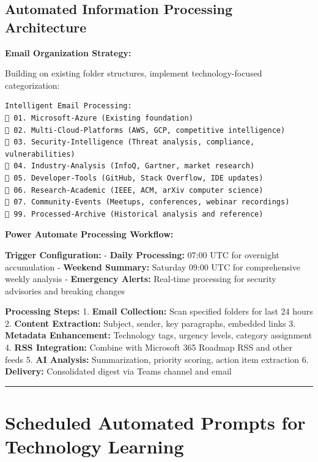 \documentclass[
  letterpaper,
  DIV=11,
  numbers=noendperiod]{scrartcl}
\begin{document}
\subsection{Automated Information Processing
Architecture}\label{automated-information-processing-architecture}

\textbf{Email Organization Strategy:}

Building on existing folder structures, implement technology-focused
categorization:

\begin{verbatim}
Intelligent Email Processing:
📁 01. Microsoft-Azure (Existing foundation)
📁 02. Multi-Cloud-Platforms (AWS, GCP, competitive intelligence)
📁 03. Security-Intelligence (Threat analysis, compliance, vulnerabilities)
📁 04. Industry-Analysis (InfoQ, Gartner, market research)
📁 05. Developer-Tools (GitHub, Stack Overflow, IDE updates)
📁 06. Research-Academic (IEEE, ACM, arXiv computer science)
📁 07. Community-Events (Meetups, conferences, webinar recordings)
📁 99. Processed-Archive (Historical analysis and reference)
\end{verbatim}

\textbf{Power Automate Processing Workflow:}

\textbf{Trigger Configuration:} - \textbf{Daily Processing:} 07:00 UTC
for overnight accumulation - \textbf{Weekend Summary:} Saturday 09:00
UTC for comprehensive weekly analysis - \textbf{Emergency Alerts:}
Real-time processing for security advisories and breaking changes

\textbf{Processing Steps:} 1. \textbf{Email Collection:} Scan specified
folders for last 24 hours 2. \textbf{Content Extraction:} Subject,
sender, key paragraphs, embedded links 3. \textbf{Metadata Enhancement:}
Technology tags, urgency levels, category assignment 4. \textbf{RSS
Integration:} Combine with Microsoft 365 Roadmap RSS and other feeds 5.
\textbf{AI Analysis:} Summarization, priority scoring, action item
extraction 6. \textbf{Delivery:} Consolidated digest via Teams channel
and email

\begin{center}\rule{0.5\linewidth}{0.5pt}\end{center}

\section{Scheduled Automated Prompts for Technology
Learning}\label{scheduled-automated-prompts-for-technology-learning}
\end{document}
